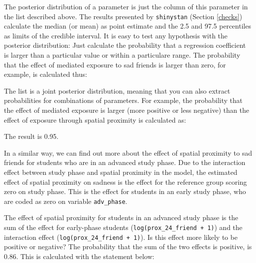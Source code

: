 \documentclass[doc]{apa6}
\newenvironment{Shaded}{\begin{snugshade}}{\end{snugshade}}
\newcommand{\KeywordTok}[1]{\textcolor[rgb]{0.13,0.29,0.53}{\textbf{#1}}}
\newcommand{\DataTypeTok}[1]{\textcolor[rgb]{0.13,0.29,0.53}{#1}}
\newcommand{\DecValTok}[1]{\textcolor[rgb]{0.00,0.00,0.81}{#1}}
\newcommand{\StringTok}[1]{\textcolor[rgb]{0.31,0.60,0.02}{#1}}
\newcommand{\OperatorTok}[1]{\textcolor[rgb]{0.81,0.36,0.00}{\textbf{#1}}}
\newcommand{\NormalTok}[1]{#1}
\begin{document}
The posterior distribution of a parameter is just the column of this
parameter in the list described above. The results presented by
\texttt{shinystan} (Section \ref{checks}) calculate the median (or mean)
as point estimate and the 2.5 and 97.5 percentiles as limits of the
credible interval. It is easy to test any hypothesis with the posterior
distribution: Just calculate the probability that a regression
coefficient is larger than a particular value or within a particulare
range. The probability that the effect of mediated exposure to sad
friends is larger than zero, for example, is calculated thus:

\begin{Shaded}
\end{Shaded}

The list is a joint posterior distribution, meaning that you can also
extract probabilities for combinations of parameters. For example, the
probability that the effect of mediated exposure is larger (more
positive or less negative) than the effect of exposure through spatial
proximity is calculated as:

\begin{Shaded}
\end{Shaded}

The result is 0.95.

In a similar way, we can find out more about the effect of spatial
proximity to sad friends for students who are in an advanced study
phase. Due to the interaction effect between study phase and spatial
proximity in the model, the estimated effect of spatial proximity on
sadness is the effect for the reference group scoring zero on study
phase. This is the effect for students in an early study phase, who are
coded as zero on variable \texttt{adv\_phase}.

The effect of spatial proximity for students in an advanced study phase
is the sum of the effect for early-phase students
(\texttt{log(prox\_24\_friend\ +\ 1)}) and the interaction effect
(\texttt{log(prox\_24\_friend\ +\ 1)}). Is this effect more likely to be
positive or negative? The probability that the sum of the two effects is
positive, is 0.86. This is calculated with the statement below:
\end{document}
